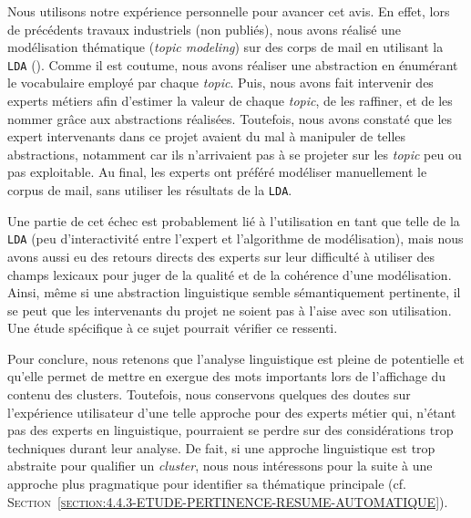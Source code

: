 			\begin{leftBarAuthorOpinion}
				Nous utilisons notre expérience personnelle pour avancer cet avis.
				En effet, lors de précédents travaux industriels (non publiés), nous avons réalisé une modélisation thématique (\textit{topic modeling}) sur des corps de mail en utilisant la \texttt{LDA} (\cite{blei-etal:2003:latent-dirichlet-allocation}).
				Comme il est coutume, nous avons réaliser une abstraction en énumérant le vocabulaire employé par chaque \textit{topic}.
				Puis, nous avons fait intervenir des experts métiers afin d'estimer la valeur de chaque \textit{topic}, de les raffiner, et de les nommer grâce aux abstractions réalisées.
				Toutefois, nous avons constaté que les expert intervenants dans ce projet avaient du mal à manipuler de telles abstractions, notamment car ils n'arrivaient pas à se projeter sur les \textit{topic} peu ou pas exploitable.
				Au final, les experts ont préféré modéliser manuellement le corpus de mail, sans utiliser les résultats de la \texttt{LDA}.
				
				Une partie de cet échec est probablement lié à l'utilisation en tant que telle de la \texttt{LDA} (peu d'interactivité entre l'expert et l'algorithme de modélisation), mais nous avons aussi eu des retours directs des experts sur leur difficulté à utiliser des champs lexicaux pour juger de la qualité et de la cohérence d'une modélisation.
				Ainsi, même si une abstraction linguistique semble sémantiquement pertinente, il se peut que les intervenants du projet ne soient pas à l'aise avec son utilisation.
				Une étude spécifique à ce sujet pourrait vérifier ce ressenti.
			\end{leftBarAuthorOpinion}
			
			Pour conclure, nous retenons que l'analyse linguistique est pleine de potentielle et qu'elle permet de mettre en exergue des mots importants lors de l'affichage du contenu des clusters.
			Toutefois, nous conservons quelques des doutes sur l'expérience utilisateur d'une telle approche pour des experts métier qui, n'étant pas des experts en linguistique, pourraient se perdre sur des considérations trop techniques durant leur analyse.
			De fait, si une approche linguistique est trop abstraite pour qualifier un \textit{cluster}, nous nous intéressons pour la suite à une approche plus pragmatique pour identifier sa thématique principale (cf. \textsc{Section~\ref{section:4.4.3-ETUDE-PERTINENCE-RESUME-AUTOMATIQUE}}).
	
